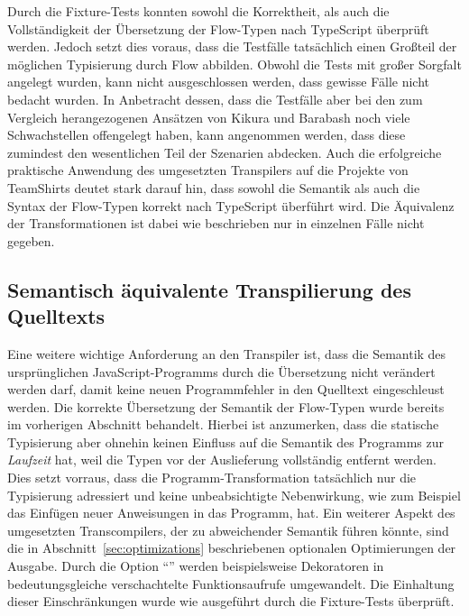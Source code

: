 Durch die Fixture-Tests konnten sowohl die Korrektheit, als auch die Vollständigkeit der Übersetzung der Flow-Typen nach TypeScript überprüft werden. Jedoch setzt dies voraus, dass die Testfälle tatsächlich einen Großteil der möglichen Typisierung durch Flow abbilden. Obwohl die Tests mit großer Sorgfalt angelegt wurden, kann nicht ausgeschlossen werden, dass gewisse Fälle nicht bedacht wurden. In Anbetracht dessen, dass die Testfälle aber bei den zum Vergleich herangezogenen Ansätzen von Kikura und Barabash noch viele Schwachstellen offengelegt haben, kann angenommen werden, dass diese zumindest den wesentlichen Teil der Szenarien abdecken. Auch die erfolgreiche praktische Anwendung des umgesetzten Transpilers auf die Projekte von TeamShirts deutet stark darauf hin, dass sowohl die Semantik als auch die Syntax der Flow-Typen korrekt nach TypeScript überführt wird. Die Äquivalenz der Transformationen ist dabei wie beschrieben nur in einzelnen Fälle nicht gegeben.

\subsection{Semantisch äquivalente Transpilierung des Quelltexts}

Eine weitere wichtige Anforderung an den Transpiler ist, dass die Semantik des ursprünglichen JavaScript-Programms durch die Übersetzung nicht verändert werden darf, damit keine neuen Programmfehler in den Quelltext eingeschleust werden. Die korrekte Übersetzung der Semantik der Flow-Typen wurde bereits im vorherigen Abschnitt behandelt. Hierbei ist anzumerken, dass die statische Typisierung aber ohnehin keinen Einfluss auf die Semantik des Programms zur \emph{Laufzeit} hat, weil die Typen vor der Auslieferung vollständig entfernt werden. Dies setzt vorraus, dass die Programm-Transformation tatsächlich nur die Typisierung adressiert und keine unbeabsichtigte Nebenwirkung, wie zum Beispiel das Einfügen neuer Anweisungen in das Programm, hat. Ein weiterer Aspekt des umgesetzten Transcompilers, der zu abweichender Semantik führen könnte, sind die in Abschnitt~\ref{sec:optimizations} beschriebenen optionalen Optimierungen der Ausgabe. Durch die Option \enquote{} werden beispielsweise Dekoratoren in bedeutungsgleiche verschachtelte Funktionsaufrufe umgewandelt. Die Einhaltung dieser Einschränkungen wurde wie ausgeführt durch die Fixture-Tests überprüft.

